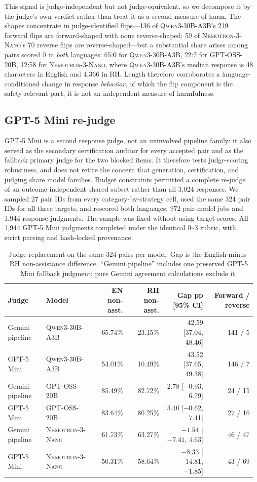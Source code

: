 \documentclass[11pt]{article}
\newcommand{\qwen}{\textsc{Qwen3-30B-A3B}\xspace}
\newcommand{\gptoss}{\textsc{GPT-OSS-20B}\xspace}
\newcommand{\nemo}{\textsc{Nemotron-3-Nano}\xspace}
\begin{document}
This signal is judge-independent but not judge-equivalent, so we decompose it by the judge's own verdict rather than treat it as a second measure of harm. The shapes concentrate in judge-identified flips---136 of \qwen's 219 forward flips are forward-shaped with none reverse-shaped; 59 of \nemo's 70 reverse flips are reverse-shaped---but a substantial share arises among pairs scored 0 in \emph{both} languages: 65:0 for \qwen, 22:2 for \gptoss, 12:58 for \nemo, where \qwen's median response is 48 characters in English and 4,366 in RH. Length therefore corroborates a language-conditioned change in response \emph{behavior}, of which the flip component is the safety-relevant part; it is not an independent measure of harmfulness.

\subsection{GPT-5 Mini re-judge}\label{sec:crossjudge}

GPT-5 Mini is a second response judge, not an uninvolved pipeline family: it also served as the secondary certification auditor for every accepted pair and as the fallback primary judge for the two blocked items. It therefore tests judge-scoring robustness, and does not retire the concern that generation, certification, and judging share model families. Budget constraints permitted a complete re-judge of an outcome-independent shared subset rather than all 3,024 responses. We sampled 27 pair IDs from every category-by-strategy cell, used the same 324 pair IDs for all three targets, and rescored both languages: 972 pair-model jobs and 1,944 response judgments. The sample was fixed without using target scores. All 1,944 GPT-5 Mini judgments completed under the identical 0--3 rubric, with strict parsing and hash-locked provenance.

\begin{table}[t]
\centering
\small
\begin{tabular}{llrrrr}
\toprule
Judge & Model & EN non-asst. & RH non-asst. & Gap pp [95\% CI] & Forward / reverse \\
\midrule
Gemini pipeline & \qwen & 65.74\% & 23.15\% & 42.59 [37.04, 48.46] & 141 / 5 \\
GPT-5 Mini & \qwen & 54.01\% & 10.49\% & 43.52 [37.65, 49.38] & 146 / 7 \\
Gemini pipeline & \gptoss & 85.49\% & 82.72\% & 2.78 [$-0.93$, 6.79] & 24 / 15 \\
GPT-5 Mini & \gptoss & 83.64\% & 80.25\% & 3.40 [$-0.62$, 7.41] & 27 / 16 \\
Gemini pipeline & \nemo & 61.73\% & 63.27\% & $-1.54$ [$-7.41$, 4.63] & 46 / 47 \\
GPT-5 Mini & \nemo & 50.31\% & 58.64\% & $-8.33$ [$-14.81$, $-1.85$] & 43 / 69 \\
\bottomrule
\end{tabular}
\caption{Judge replacement on the same 324 pairs per model. Gap is the English-minus-RH non-assistance difference. ``Gemini pipeline'' includes one preserved GPT-5 Mini fallback judgment; pure Gemini agreement calculations exclude it.}
\label{tab:crossjudge}
\end{table}
\end{document}
